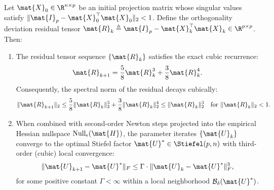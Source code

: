 \begin{theorem}
\label{thm:hnc_cubic_convergence}
Let $\mat{X}_0 \in \R^{n \times p}$ be an initial projection matrix whose singular values satisfy $\|\mat{I}_p - \mat{X}_0^\top \mat{X}_0\|_2 < 1$. Define the orthogonality deviation residual tensor $\mat{R}_k \triangleq \mat{I}_p - \mat{X}_k^\top \mat{X}_k \in \R^{p \times p}$. Then:
\begin{enumerate}
    \item The residual tensor sequence $\{\mat{R}_k\}$ satisfies the exact cubic recurrence:
    \begin{equation}
    \mat{R}_{k+1} = \frac{5}{8} \mat{R}_k^3 + \frac{3}{8} \mat{R}_k^4.
    \label{eq:residual_cubic_recurrence}
    \end{equation}
    Consequently, the spectral norm of the residual decays cubically:
    \begin{equation}
    \| \mat{R}_{k+1} \|_2 \le \frac{5}{8} \| \mat{R}_k \|_2^3 + \frac{3}{8} \| \mat{R}_k \|_2^4 \le \| \mat{R}_k \|_2^3 \quad \text{for } \| \mat{R}_k \|_2 < 1.
    \label{eq:residual_norm_cubic}
    \end{equation}
    \item When combined with second-order Newton steps projected into the empirical Hessian nullspace $\Null_\epsilon(\mat{H})$, the parameter iterates $\{\mat{U}_k\}$ converge to the optimal Stiefel factor $\mat{U}^* \in \Stiefel(p, n)$ with third-order (cubic) local convergence:
    \begin{equation}
    \| \mat{U}_{k+1} - \mat{U}^* \|_F \le \Gamma \cdot \| \mat{U}_k - \mat{U}^* \|_F^3,
    \label{eq:thm8_cubic_convergence}
    \end{equation}
    for some positive constant $\Gamma < \infty$ within a local neighborhood $\mathcal{B}_\delta(\mat{U}^*)$.
\end{enumerate}
\end{theorem}

